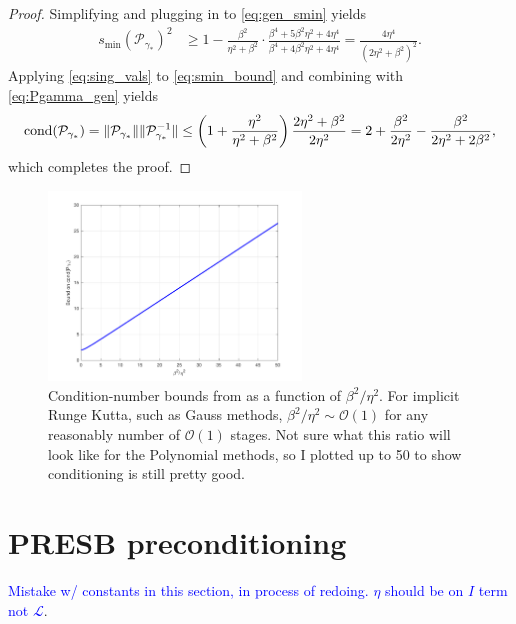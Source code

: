 \documentclass[a4paper,10pt]{article}
\newcommand{\tcb}{\textcolor{blue}}
\begin{document}
\begin{proof}
%
Simplifying and plugging in to \eqref{eq:gen_smin} yields
%
\begin{align}\label{eq:smin_bound}
s_{\min}(\mathcal{P}_{\gamma_*})^2 &\geq 1 - \frac{\beta^2}{\eta^2+\beta^2} \cdot
	\frac{\beta^4+5\beta^2\eta^2+4\eta^4}{\beta^4+4\beta^2\eta^2+4\eta^4}
= \frac{4\eta^4}{(2\eta^2+\beta^2)^2}.
\end{align}
%
Applying \eqref{eq:sing_vals} to \eqref{eq:smin_bound} and
combining with \eqref{eq:Pgamma_gen} yields
%
\begin{align}
\textnormal{cond}(\mathcal{P}_{\gamma_*}) = \|\mathcal{P}_{\gamma_*}\|\|\mathcal{P}_{\gamma_*}^{-1}\|
	\leq \left(1+\frac{\eta^2}{\eta^2+\beta^2}\right)\frac{2\eta^2+\beta^2}{2\eta^2}
	= 2+\frac{\beta^2}{2\eta^2} - \frac{\beta^2}{2\eta^2+2\beta^2},
\end{align}
%
which completes the proof.
\end{proof}
%

\begin{figure}[h!]
\centering
\includegraphics[width = 0.6\textwidth]{./cond.pdf}
\caption{Condition-number bounds from  as a function of $\beta^2/\eta^2$.
For implicit Runge Kutta, such as Gauss methods, $\beta^2/\eta^2\sim\mathcal{O}(1)$ for
any reasonably number of $\mathcal{O}(1)$ stages. Not sure what this ratio will look
like for the Polynomial methods, so I plotted up to 50 to show conditioning is still
pretty good.}
\label{fig:bound}
\end{figure}




\section{PRESB preconditioning}
\tcb{Mistake w/ constants in this section, in process of redoing. $\eta$ should
be on $I$ term not $\mathcal{L}$}.
\end{document}
